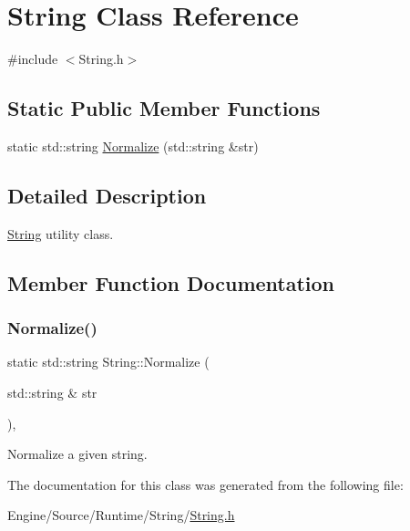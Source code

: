 \hypertarget{class_string}{}\section{String Class Reference}
\label{class_string}


{\ttfamily \#include $<$String.\+h$>$}

\subsection*{Static Public Member Functions}
\begin{DoxyCompactItemize}
\item 
static std\+::string \mbox{\hyperlink{class_string_a30760cf947e41b306621aeb2da0a1eee}{Normalize}} (std\+::string \&str)
\end{DoxyCompactItemize}


\subsection{Detailed Description}
\mbox{\hyperlink{class_string}{String}} utility class. 

\subsection{Member Function Documentation}
\mbox{\label{class_string_a30760cf947e41b306621aeb2da0a1eee}} 
\subsubsection{\texorpdfstring{Normalize()}{Normalize()}}
{\footnotesize\ttfamily static std\+::string String\+::\+Normalize (\begin{DoxyParamCaption}\item[{std\+::string \&}]{str }\end{DoxyParamCaption})\hspace{0.3cm}{\ttfamily [inline]}, {\ttfamily [static]}}

Normalize a given string. 

The documentation for this class was generated from the following file\+:\begin{DoxyCompactItemize}
\item 
Engine/\+Source/\+Runtime/\+String/\mbox{\hyperlink{_string_8h}{String.\+h}}\end{DoxyCompactItemize}
